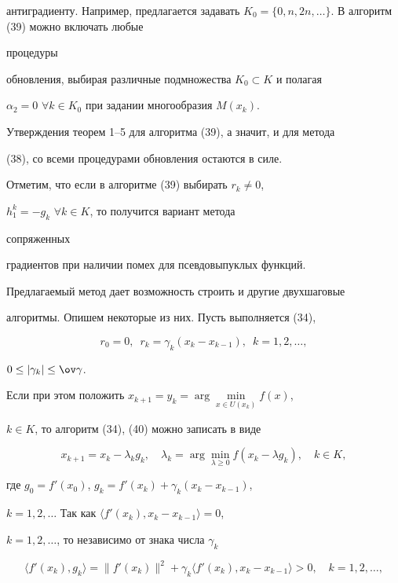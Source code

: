антиградиенту. Например, предлагается задавать $K_0=


\{0,n,2n,\dotsc\}$. В алгоритм (39) можно включать любые 


процедуры


обновления, выбирая различные подмножества $K_0\subset K$ и полагая


$\alpha_2=0$ $\forall k\in K_0$ при задании многообразия $M(x_k)$. 


Утверждения теорем 1--5 для алгоритма (39), а значит, и для метода 


(38), со всеми процедурами обновления остаются в силе.


Отметим, что если в алгоритме (39) выбирать $r_k\neq 0$,


$h^k_1=-g_k$ $\forall k\in K$, то получится вариант метода 


сопряженных


градиентов при наличии помех для псевдовыпуклых функций.





Предлагаемый метод дает возможность строить и другие двухшаговые 


алгоритмы. Опишем некоторые из них. Пусть выполняется (34),


\begin{equation}


r_0=0,\ \; r_k=\gamma_k(x_k-x_{k-1}),\ \; k=1,2,\dotsc,


\end{equation}


$0\leq |\gamma_k|\leq\ov \gamma$.


Если при этом положить $x_{k+1}=y_k=\arg \min\limits_{x\in U(x_k)}f(x)$,


$k\in K$, то алгоритм (34), (40) можно записать в виде


\begin{equation}


x_{k+1}=x_k-\lambda_kg_k,\quad \lambda_k=\arg \min_{\lambda \geq 0}


f(x_k-\lambda g_k),\quad k\in K,


\end{equation}


где $g_0={f}'(x_0)$, $g_k={f}'(x_k)+\gamma_k(x_k-x_{k-1})$,


$k=1,2,\dotsc$ Так как $\langle f'(x_k),x_k-x_{k-1}\rangle=0$,


$k=1,2,\dotsc$, то независимо от знака числа $\gamma_k$


\begin{equation}


\langle f'(x_k),g_k\rangle =\|f'(x_k)\|^2+\gamma_k


\langle f'(x_k),x_k-x_{k-1}\rangle >0,\quad k=1,2,\dotsc,


\end{equation}


